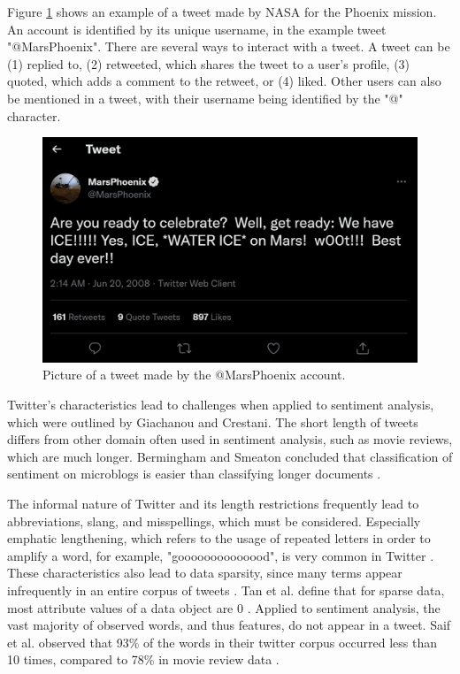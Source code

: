 Figure \ref{fig:example_tweet} shows an example of a tweet made by NASA for the Phoenix mission. An account is identified by its unique username, in the example tweet "@MarsPhoenix". There are several ways to interact with a tweet. A tweet can be (1) replied to, (2) retweeted, which shares the tweet to a user's profile, (3) quoted, which adds a comment to the retweet, or (4) liked. Other users can also be mentioned in a tweet, with their username being identified by the "@" character. 

\begin{figure}
    \centering
    \includegraphics[scale=0.3]{Images/twitter_image.png}
    \caption{Picture of a tweet made by the @MarsPhoenix account.}
    \label{fig:example_tweet}
\end{figure}

Twitter's characteristics lead to challenges when applied to sentiment analysis, which were outlined by Giachanou and Crestani. The short length of tweets differs from other domain often used in sentiment analysis, such as movie reviews, which are much longer. Bermingham and Smeaton concluded that classification of sentiment on microblogs is easier than classifying longer documents \cite{microblogs}.

The informal nature of Twitter and its length restrictions frequently lead to abbreviations, slang, and misspellings, which must be considered. Especially emphatic lengthening, which refers to the usage of repeated letters in order to amplify a word, for example, "goooooooooooood", is very common in Twitter \cite{DBLP:journals/csur/GiachanouC16}. These characteristics also lead to data sparsity, since many terms appear infrequently in an entire corpus of tweets \cite{DBLP:journals/csur/GiachanouC16}. Tan et al. define that for sparse data, most attribute values of a data object are 0 \cite{DBLP:books/aw/TanSKK2019}. Applied to sentiment analysis, the vast majority of observed words, and thus features, do not appear in a tweet. Saif et al. observed that 93\% of the words in their twitter corpus occurred less than 10 times, compared to 78\% in movie review data \cite{data_sparsity}. 

